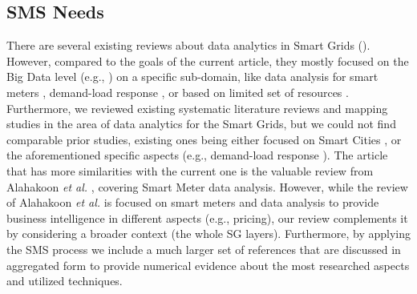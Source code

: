 \documentclass[journal]{IEEEtran}
\begin{document}
\subsection{SMS Needs}
\label{sec:SMS-needs}
There are several existing reviews about data analytics in Smart Grids (\cite{ref:diamantoulakis2015big, ref:tu2017bigdatareview, ref:hu2016bigdatachallenges, ref:alahakoon2016futuresurvey,ref:benetti2016slr, ref:yan2013communicationsurvey, ref:bhardwaj2017smartgridsanalyticssystematic, ref:pawar2017data-analytics-brief-review, ref:ge2018big}). However, compared to the goals of the current article, they mostly focused on the Big Data level (e.g., \cite{ref:diamantoulakis2015big, ref:tu2017bigdatareview}) on a specific sub-domain, like data analysis for smart meters \cite{ref:alahakoon2016futuresurvey}, demand-load response \cite{ref:benetti2016slr}, or based on limited set of resources \cite{ref:bhardwaj2017smartgridsanalyticssystematic, ref:pawar2017data-analytics-brief-review}. 
Furthermore, we reviewed existing systematic literature reviews and mapping studies in the area of data analytics for the Smart Grids, but we could not find comparable prior studies, existing ones being either focused on Smart Cities \cite{ref:cocchia2014smartcity}, or the aforementioned specific aspects (e.g., demand-load response \cite{ref:benetti2016slr}).
The article that has more similarities with the current one is the valuable review from Alahakoon \textit{et al.} \cite{ref:alahakoon2016futuresurvey}, covering Smart Meter data analysis. However, while the review of Alahakoon \textit{et al.} \cite{ref:alahakoon2016futuresurvey} is focused on smart meters and data analysis to provide business intelligence in different aspects (e.g., pricing), our review complements it by considering a broader context (the whole SG layers). Furthermore, by applying the SMS process we include a much larger set of references that are discussed in aggregated form to provide numerical evidence about the most researched aspects and utilized techniques.
\end{document}
